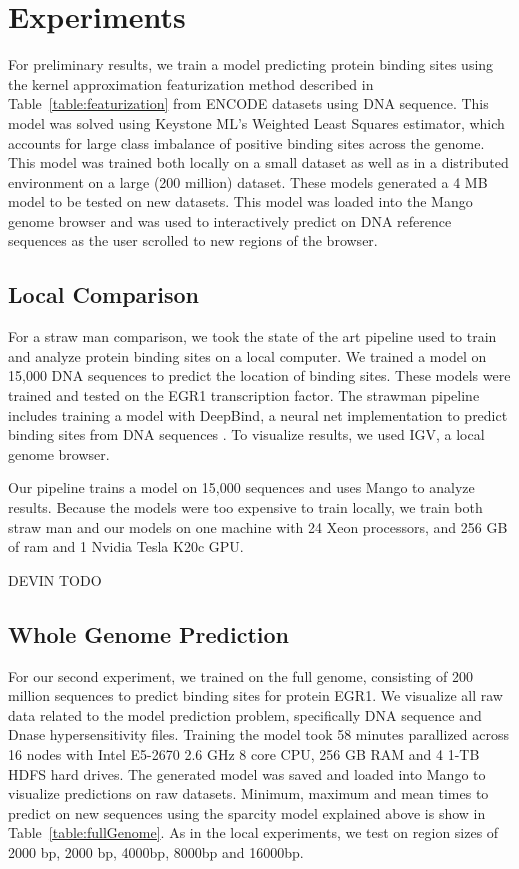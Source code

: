\documentclass{sig-alternate-05-2015}
\begin{document}
\section{Experiments}
For preliminary results, we train a model predicting protein binding sites using the kernel approximation featurization method described in Table~\ref{table:featurization}  from ENCODE datasets using DNA sequence. This model was solved using Keystone ML’s Weighted Least Squares estimator, which accounts for large class imbalance of positive binding sites across the genome. This model was trained both locally on a small dataset as well as in a distributed environment on a large (200 million) dataset. These models generated a 4 MB model to be tested on new datasets. This model was loaded into the Mango genome browser and was used to interactively predict on DNA reference sequences as the user scrolled to new regions of the browser.


\subsection{Local Comparison}
For a straw man comparison, we took the state of the art pipeline used to train and analyze protein binding sites on a local computer. We trained a model on 15,000 DNA sequences to predict the location of binding sites. These models were trained and tested on the EGR1 transcription factor. The strawman pipeline includes training a model with DeepBind, a neural net implementation to predict binding sites from DNA sequences \cite{alipanahi2015predicting}. To visualize results, we used IGV, a local genome browser.


Our pipeline trains a model on 15,000 sequences and uses Mango to analyze results. Because the models were too expensive to train locally, we train both straw man and our models on one machine with 24 Xeon processors, and 256 GB of ram and 1 Nvidia Tesla K20c GPU.

DEVIN TODO

\subsection{Whole Genome Prediction}
For our second experiment, we trained on the full genome, consisting of 200 million sequences to predict binding sites for protein EGR1. We visualize all raw data related to the model prediction problem, specifically DNA sequence and Dnase hypersensitivity files. Training the model took 58 minutes parallized across 16 nodes with Intel E5-2670 2.6 GHz 8 core CPU, 256 GB RAM and 4 1-TB HDFS hard drives. The generated model was saved and loaded into Mango to visualize predictions on raw datasets. Minimum, maximum and mean times to predict on new sequences using the sparcity model explained above is show in Table~\ref{table:fullGenome}. As in the local experiments, we test on region sizes of 2000 bp, 2000 bp, 4000bp, 8000bp and 16000bp. \\
\end{document}
